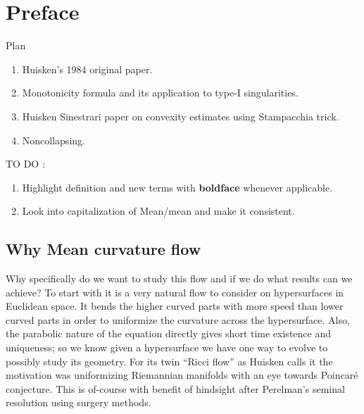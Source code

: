 \chapter{Preface}Plan 

\begin{enumerate}
    \item Huisken's 1984 original paper.
    \item Monotonicity formula and its application to type-I singularities.
    \item Huisken Sinestrari paper on convexity estimates using Stampacchia trick.
    \item Noncollapsing.
\end{enumerate}

TO DO : \begin{enumerate}
    \item Highlight definition and new terms with \textbf{boldface} whenever applicable. 
    \item Look into capitalization of Mean/mean and make it consistent. 
\end{enumerate}

    \section*{Why Mean curvature flow}

Why specifically do we want to study this flow and if we do what results can we achieve? To start with it is a very natural flow to consider on hypersurfaces in Euclidean space. It bends the higher curved parts with more speed than lower curved parts in order to uniformize the curvature across the hypersurface. Also, the parabolic nature of the equation directly gives short time existence and uniqueness; so we know given a hypersurface we have one way to evolve to possibly study its geometry. For its twin ``Ricci flow'' as Huisken calls it the motivation was uniformizing Riemannian manifolds with an eye towards Poincar\'e conjecture. This is of-course with benefit of hindsight after Perelman's seminal resolution using surgery methods. 

